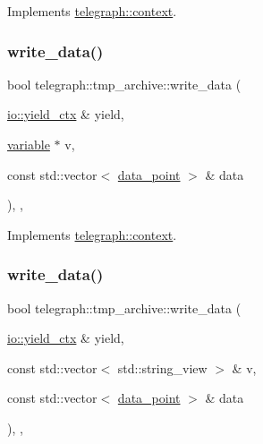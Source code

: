 Implements \hyperlink{classtelegraph_1_1context_a8db167973f187f707a4108e112683969}{telegraph\+::context}.

\mbox{\label{classtelegraph_1_1tmp__archive_ae1838ff3fc3f1cd0eab31535a2f2e974}} 
\subsubsection{\texorpdfstring{write\+\_\+data()}{write\_data()}\hspace{0.1cm}{\footnotesize\ttfamily [1/2]}}
{\footnotesize\ttfamily bool telegraph\+::tmp\+\_\+archive\+::write\+\_\+data (\begin{DoxyParamCaption}\item[{\hyperlink{structboost_1_1asio_1_1yield__ctx}{io\+::yield\+\_\+ctx} \&}]{yield,  }\item[{\hyperlink{classtelegraph_1_1variable}{variable} $\ast$}]{v,  }\item[{const std\+::vector$<$ \hyperlink{classtelegraph_1_1data__point}{data\+\_\+point} $>$ \&}]{data }\end{DoxyParamCaption})\hspace{0.3cm}{\ttfamily [inline]}, {\ttfamily [override]}, {\ttfamily [virtual]}}



Implements \hyperlink{classtelegraph_1_1context_a6067b9a6f2590733c81f6a3b2ed9cba7}{telegraph\+::context}.

\mbox{\label{classtelegraph_1_1tmp__archive_a228c2c681beb749268d09cd83d594246}} 
\subsubsection{\texorpdfstring{write\+\_\+data()}{write\_data()}\hspace{0.1cm}{\footnotesize\ttfamily [2/2]}}
{\footnotesize\ttfamily bool telegraph\+::tmp\+\_\+archive\+::write\+\_\+data (\begin{DoxyParamCaption}\item[{\hyperlink{structboost_1_1asio_1_1yield__ctx}{io\+::yield\+\_\+ctx} \&}]{yield,  }\item[{const std\+::vector$<$ std\+::string\+\_\+view $>$ \&}]{v,  }\item[{const std\+::vector$<$ \hyperlink{classtelegraph_1_1data__point}{data\+\_\+point} $>$ \&}]{data }\end{DoxyParamCaption})\hspace{0.3cm}{\ttfamily [inline]}, {\ttfamily [override]}, {\ttfamily [virtual]}}



